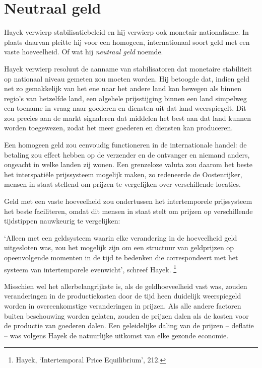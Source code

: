 \documentclass[smalldemyvopaper,11pt,twoside,onecolumn,openright,extrafontsizes,hidelinks]{memoir}
\begin{document}
\section{Neutraal geld}\label{neutraal-geld-1}

Hayek verwierp stabilisatiebeleid en hij verwierp ook monetair
nationalisme. In plaats daarvan pleitte hij voor een homogeen,
internationaal soort geld met een vaste hoeveelheid. Of wat hij
\emph{neutraal geld} noemde.

Hayek verwierp resoluut de aanname van stabilisatoren dat monetaire
stabiliteit op nationaal niveau gemeten zou moeten worden. Hij betoogde
dat, indien geld net zo gemakkelijk van het ene naar het andere land kan
bewegen als binnen regio's van hetzelfde land, een algehele
prijsstijging binnen een land simpelweg een toename in vraag naar
goederen en diensten uit dat land weerspiegelt. Dit zou precies aan de
markt signaleren dat middelen het best aan dat land kunnen worden
toegewezen, zodat het meer goederen en diensten kan produceren.

Een homogeen geld zou eenvoudig functioneren in de internationale
handel: de betaling zou effect hebben op de verzender en de ontvanger en
niemand anders, ongeacht in welke landen zij wonen. Een grenzeloze
valuta zou daarom het beste het interspatiële prijssysteem mogelijk
maken, zo redeneerde de Oostenrijker, mensen in staat stellend om
prijzen te vergelijken over verschillende locaties.

Geld met een vaste hoeveelheid zou ondertussen het intertemporele
prijssysteem het beste faciliteren, omdat dit mensen in staat stelt om
prijzen op verschillende tijdstippen nauwkeurig te vergelijken:

`Alleen met een geldsysteem waarin elke verandering in de hoeveelheid
geld uitgesloten was, zou het mogelijk zijn om een structuur van
geldprijzen op opeenvolgende momenten in de tijd te bedenken die
correspondeert met het systeem van intertemporele evenwicht', schreef
Hayek. \footnote{\hspace{0pt}Hayek, `Intertemporal Price Equilibrium',
  212.}

Misschien wel het allerbelangrijkste is, als de geldhoeveelheid vast
was, zouden veranderingen in de productiekosten door de tijd heen
duidelijk weerspiegeld worden in overeenkomstige veranderingen in
prijzen. Als alle andere factoren buiten beschouwing worden gelaten,
zouden de prijzen dalen als de kosten voor de productie van goederen
dalen. Een geleidelijke daling van de prijzen -- deflatie -- was volgens
Hayek de natuurlijke uitkomst van elke gezonde economie.
\end{document}
